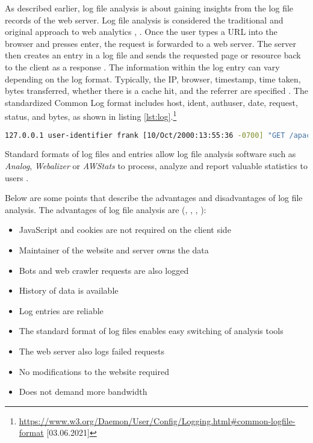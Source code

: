 As described earlier, log file analysis is about gaining insights from the log file records of the web server.
Log file analysis is considered the traditional and original approach to web analytics \cite{2011Marek}, \cite{2015Zheng}.
Once the user types a URL into the browser and presses enter, the request is forwarded to a web server.
The server then creates an entry in a log file and sends the requested page or resource back to the client as a response \cite{2009Waisberg}.
The information within the log entry can vary depending on the log format.
Typically, the IP, browser, timestamp, time taken, bytes transferred, whether there is a cache hit, and the referrer are specified \cite{2009Waisberg}.
The standardized Common Log format includes host, ident, authuser, date, request, status, and bytes, as shown in listing \ref{lst:log}.\footnote{\url{https://www.w3.org/Daemon/User/Config/Logging.html\#common-logfile-format} [03.06.2021]}

\begin{center}
\begin{lstlisting}[caption={CLF}, language=bash, numbers=none, basicstyle=\tiny, label={lst:log}]
127.0.0.1 user-identifier frank [10/Oct/2000:13:55:36 -0700] "GET /apache_pb.gif HTTP/1.0" 200 2326
\end{lstlisting}
\end{center}

Standard formats of log files and entries allow log file analysis software such as \textit{Analog}, \textit{Webalizer} or \textit{AWStats} to process, analyze and report valuable statistics to users \cite{2015Zheng}.


Below are some points that describe the advantages and disadvantages of log file analysis.
The advantages of log file analysis are (\cite{2009Waisberg}, \cite{2011Nakatani}, \cite{2014Singal}, \cite{2015Zheng}):

\begin{itemize}
\item JavaScript and cookies are not required on the client side
\item Maintainer of the website and server owns the data %
\item Bots and web crawler requests are also logged %
\item History of data is available %
\item Log entries are reliable %
\item The standard format of log files enables easy switching of analysis tools %
\item The web server also logs failed requests %
\item No modifications to the website required %
\item Does not demand more bandwidth %
\end{itemize}


